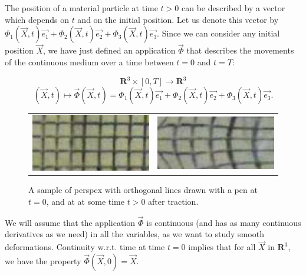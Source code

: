 \documentclass[DIV=12]{article}
\begin{document}
 The position of a material particle at time $t >0$
 can be described by a vector which depends on $t$ and on the initial position.
 Let us denote this vector by $\Phi_1(\vec{X}, t) \vec{e_1} + \Phi_2( \vec{X},t)\vec{e_2} + \Phi_3( \vec{X}, t )\vec{e_3}$.
 Since we can consider any initial position $\vec{X}$, we have just defined an application $\vec{\Phi}$
 that describes the movements of the continuous medium over a time between $t=0$ and $t=T$:

\begin{equation}
 {\mathbf{R}^3}\times [ 0, T] \longrightarrow {\mathbf{R}^3}
\end{equation}
\begin{equation}
 (\vec{X},t)\mapsto \vec{\Phi}( \overrightarrow{X},t) = \Phi_1(\vec{X}, t) \vec{e_1} + \Phi_2( \vec{X},t) \vec{e_2} + \Phi_3( \vec{X}, t ) \vec{e_3}.
\label{flowDef}
\end{equation}

\begin{figure}[htp]
 \centering

  \begin{tabular}{cc}


    \includegraphics[width=60mm]{recGrid.png}&

    \includegraphics[width=60mm]{recGridPrime.png}\\
  \end{tabular}
\label{figur}\caption{A sample of perspex with 
 orthogonal lines drawn with a pen at $t=0$, and at at some time $t>0$ after traction.}

\end{figure}
We will assume that the application $\vec{\Phi}$ is continuous (and has as many continuous derivatives as we need) in 
 all the variables, as we want to study smooth deformations. Continuity w.r.t.  time at time $t=0$ implies 
 that for all $\vec{X}$ in $\mathbf{R}^3$, we have the property $\vec{\Phi}(\vec{X},0) = \vec{X}.$\\
\end{document}
